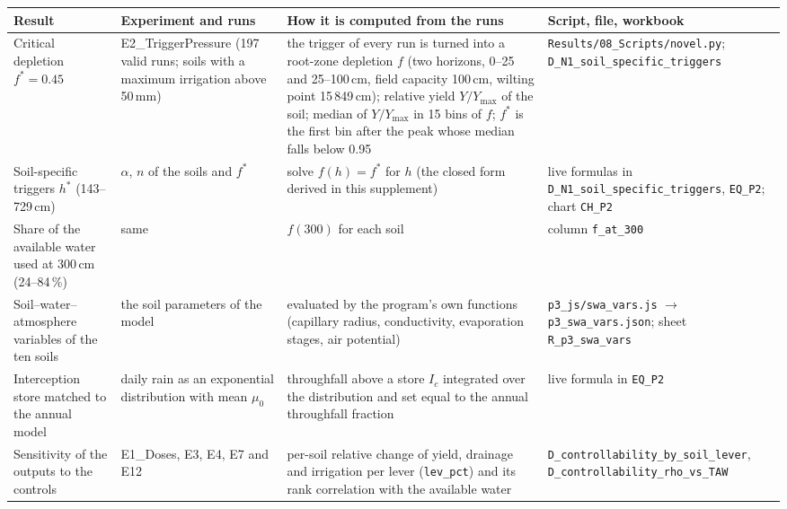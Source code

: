 
{\footnotesize\begin{longtable}{>{\raggedright\arraybackslash}p{}>{\raggedright\arraybackslash}p{}>{\raggedright\arraybackslash}p{}>{\raggedright\arraybackslash}p{}}
\toprule Result & Experiment and runs & How it is computed from the runs & Script, file, workbook\\\midrule\endhead
Critical depletion $f^\ast=0.45$ & E2\_\allowbreak{}TriggerPressure (197 valid runs; soils with a maximum irrigation above 50\,mm) & the trigger of every run is turned into a root-zone depletion $f$ (two horizons, 0--25 and 25--100\,cm, field capacity 100\,cm, wilting point 15\,849\,cm); relative yield $Y/Y_{\max}$ of the soil; median of $Y/Y_{\max}$ in 15 bins of $f$; $f^\ast$ is the first bin after the peak whose median falls below 0.95 & \texttt{Results/08\_\allowbreak{}Scripts/novel.py}; \texttt{D\_\allowbreak{}N1\_\allowbreak{}soil\_\allowbreak{}specific\_\allowbreak{}triggers}\\
Soil-specific triggers $h^\ast$ (143--729\,cm) & $\alpha$, $n$ of the soils and $f^\ast$ & solve $f(h)=f^\ast$ for $h$ (the closed form derived in this supplement) & live formulas in \texttt{D\_\allowbreak{}N1\_\allowbreak{}soil\_\allowbreak{}specific\_\allowbreak{}triggers}, \texttt{EQ\_\allowbreak{}P2}; chart \texttt{CH\_\allowbreak{}P2}\\
Share of the available water used at 300\,cm (24--84\,\%) & same & $f(300)$ for each soil & column \texttt{f\_\allowbreak{}at\_\allowbreak{}300}\\
Soil--water--atmosphere variables of the ten soils & the soil parameters of the model & evaluated by the program's own functions (capillary radius, conductivity, evaporation stages, air potential) & \texttt{p3\_\allowbreak{}js/swa\_\allowbreak{}vars.js} $\to$ \texttt{p3\_\allowbreak{}swa\_\allowbreak{}vars.json}; sheet \texttt{R\_\allowbreak{}p3\_\allowbreak{}swa\_\allowbreak{}vars}\\
Interception store matched to the annual model & daily rain as an exponential distribution with mean $\mu_0$ & throughfall above a store $I_c$ integrated over the distribution and set equal to the annual throughfall fraction & live formula in \texttt{EQ\_\allowbreak{}P2}\\
Sensitivity of the outputs to the controls & E1\_\allowbreak{}Doses, E3, E4, E7 and E12 & per-soil relative change of yield, drainage and irrigation per lever (\texttt{lev\_\allowbreak{}pct}) and its rank correlation with the available water & \texttt{D\_\allowbreak{}controllability\_\allowbreak{}by\_\allowbreak{}soil\_\allowbreak{}lever}, \texttt{D\_\allowbreak{}controllability\_\allowbreak{}rho\_\allowbreak{}vs\_\allowbreak{}TAW}\\

\end{longtable}}
